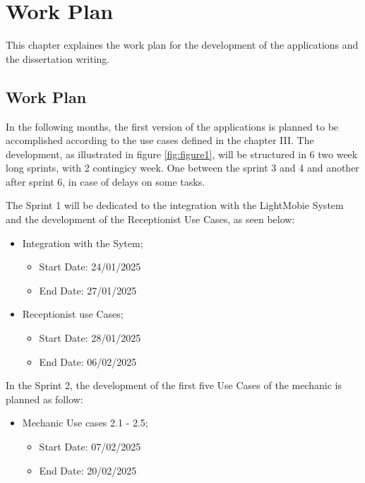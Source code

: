 \chapter{Work Plan}%
\label{chapter:workPlan}

\begin{introduction}
This chapter explaines the work plan for the development of the applications and the dissertation writing.
\end{introduction} 


\section{Work Plan}

In the following months, the first version of the applications is planned to be accomplished according to the use cases defined in the chapter III. 
The development, as illustrated in figure \ref{fig:figure1}, will be structured in 6 two week long sprints, with 2 contingicy week. One between the sprint 3 and 4 and another after sprint 6, in case of delays on some tasks.

The Sprint 1 will be dedicated to the integration with the LightMobie System and the development of the Receptionist Use Cases, as seen below: 

\begin{itemize}
  \item Integration with the Sytem;
  \begin{itemize}
      \item Start Date: 24/01/2025 
      \item End Date: 27/01/2025 
  \end{itemize}
    \item Receptionist use Cases;
    \begin{itemize}
        \item Start Date: 28/01/2025 
        \item End Date: 06/02/2025 
    \end{itemize}
  \end{itemize}

In the Sprint 2, the development of the first five Use Cases of the mechanic is planned as follow:  

\begin{itemize}
  \item Mechanic Use cases 2.1 - 2.5;
    \begin{itemize}
      \item Start Date: 07/02/2025 
      \item End Date: 20/02/2025 
  \end{itemize}
\end{itemize}

